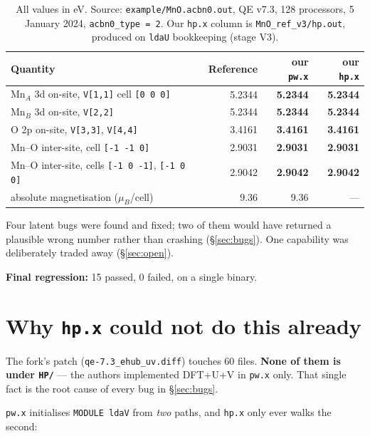 \documentclass[11pt,a4paper]{article}
\newcommand{\C}[1]{\texttt{\small #1}}
\begin{document}
\begin{table}[h]
\centering\small
\begin{tabular}{lrrr}
\toprule
Quantity & Reference & our \C{pw.x} & our \C{hp.x} \\
\midrule
Mn$_A$ 3d on-site, \C{V[1,1]} cell \C{[0 0 0]} & 5.2344 & \textbf{5.2344} & \textbf{5.2344} \\
Mn$_B$ 3d on-site, \C{V[2,2]}                  & 5.2344 & \textbf{5.2344} & \textbf{5.2344} \\
O 2p on-site, \C{V[3,3]}, \C{V[4,4]}           & 3.4161 & \textbf{3.4161} & \textbf{3.4161} \\
Mn--O inter-site, cell \C{[-1 -1 0]}           & 2.9031 & \textbf{2.9031} & \textbf{2.9031} \\
Mn--O inter-site, cells \C{[-1 0 -1]}, \C{[-1 0 0]} & 2.9042 & \textbf{2.9042} & \textbf{2.9042} \\
\midrule
absolute magnetisation ($\mu_B$/cell)          & 9.36   & 9.36 & --- \\
\bottomrule
\end{tabular}
\caption{All values in eV. Source: \C{example/MnO.acbn0.out}, QE v7.3, 128
processors, 5 January 2024, \C{acbn0_type = 2}. Our \C{hp.x} column is
\C{MnO_ref_v3/hp.out}, produced on \C{ldaU} bookkeeping (stage V3).}
\end{table}

\noindent
Four latent bugs were found and fixed; two of them would have returned a
plausible wrong number rather than crashing (\S\ref{sec:bugs}). One capability
was deliberately traded away (\S\ref{sec:open}).

\smallskip
\noindent
\textbf{Final regression:} 15 passed, 0 failed, on a single binary.

\section{Why \texttt{hp.x} could not do this already}

The fork's patch (\C{qe-7.3_ehub_uv.diff}) touches 60 files. \textbf{None of them
is under \C{HP/}} --- the authors implemented DFT+U+V in \C{pw.x} only. That single
fact is the root cause of every bug in \S\ref{sec:bugs}.

\C{pw.x} initialises \C{MODULE ldaV} from \emph{two} paths, and \C{hp.x} only ever
walks the second:
\end{document}
